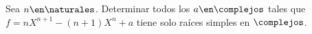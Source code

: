 \ejercicio

Sea $n \en \naturales$. Determinar todos los $a \en \complejos$ tales que
$f = nX^{n+1} - (n+1)X^n + a$ tiene solo raíces simples en $\complejos$.

\separadorCorto
 
